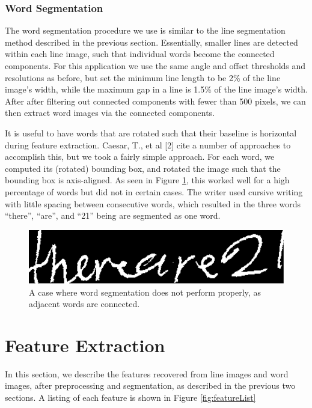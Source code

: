 \documentclass[paper=a4, fontsize=11pt]{scrartcl} %
\numberwithin{equation}{section} %
\numberwithin{figure}{section} %
\numberwithin{table}{section} %
\begin{document}
\subsubsection{Word Segmentation}
The word segmentation procedure we use is similar to the line
segmentation method described in the previous section. Essentially,
smaller lines are detected within each line image, such that
individual words become the connected components. For this application
we use the same angle and offset thresholds and resolutions as before,
but set the minimum line length to be 2\% of the line image's width,
while the maximum gap in a line is 1.5\% of the line image's
width. After after filtering out connected components with fewer than
500 pixels, we can then extract word images via the connected
components.

It is useful to have words that are rotated such that their baseline
is horizontal during feature extraction. Caesar, T., et al [2] cite a
number of approaches to accomplish this, but we took a fairly simple
approach. For each word, we computed its (rotated) bounding box, and
rotated the image such that the bounding box is axis-aligned. As seen
in Figure \ref{fig:wordfail}, this worked well for a high percentage
of words but did not in certain cases. The writer used cursive writing
with little spacing between consecutive words, which resulted in the
three words “there”, “are”, and “21” being are segmented as one word.

\begin{figure}
  \centering \includegraphics{wordfail.png}
  \caption{A case where word segmentation does not perform properly,
    as adjacent words are connected.}
  \label{fig:wordfail}
\end{figure}


\section{Feature Extraction}
\label{sec:feature}
In this section, we describe the features recovered from line images
and word images, after preprocessing and segmentation, as described in
the previous two sections. A listing of each feature is shown in
Figure \ref{fig:featureList}
\end{document}
